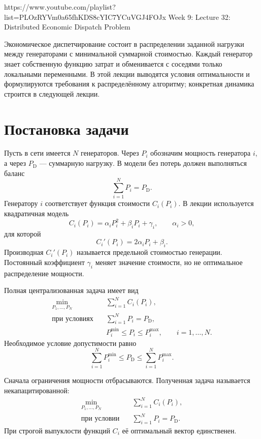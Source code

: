 
\sourcevideo
    {https://www.youtube.com/playlist?list=PLOzRYVm0a65fhKDS8cYIC7YCuVGJ4FOJx}
    {Week 9: Lecture 32: Distributed Economic Dispatch Problem}

Экономическое диспетчирование состоит в распределении заданной
нагрузки между генераторами с минимальной суммарной стоимостью. Каждый
генератор знает собственную функцию затрат и обменивается с соседями
только локальными переменными. В этой лекции выводятся условия
оптимальности и формулируются требования к распределённому алгоритму;
конкретная динамика строится в следующей лекции.

\section{Постановка задачи}

Пусть в сети имеется \(N\) генераторов. Через \(P_i\) обозначим
мощность генератора \(i\), а через \(P_{\mathrm D}\) --- суммарную
нагрузку. В модели без потерь должен выполняться баланс
\[
    \sum_{i=1}^{N}P_i=P_{\mathrm D}.
\]
Генератору \(i\) соответствует функция стоимости \(C_i(P_i)\). В
лекции используется квадратичная модель
\[
    C_i(P_i)
    =
    \alpha_iP_i^2+\beta_iP_i+\gamma_i,
    \qquad
    \alpha_i>0,
\]
для которой
\[
    C_i'(P_i)=2\alpha_iP_i+\beta_i.
\]
Производная \(C_i'(P_i)\) называется предельной стоимостью генерации.
Постоянный коэффициент \(\gamma_i\) меняет значение стоимости, но не
оптимальное распределение мощности.

Полная централизованная задача имеет вид
\[
\begin{aligned}
    \min_{P_1,\ldots,P_N}\quad
    &\sum_{i=1}^{N}C_i(P_i),
    \\
    \text{при условиях}\quad
    &\sum_{i=1}^{N}P_i=P_{\mathrm D},
    \\
    &P_i^{\min}\le P_i\le P_i^{\max},
    \qquad i=1,\ldots,N.
\end{aligned}
\]
Необходимое условие допустимости равно
\[
    \sum_{i=1}^{N}P_i^{\min}
    \le
    P_{\mathrm D}
    \le
    \sum_{i=1}^{N}P_i^{\max}.
\]

Сначала ограничения мощности отбрасываются. Полученная задача
называется некапацитированной:
\[
\begin{aligned}
    \min_{P_1,\ldots,P_N}\quad
    &\sum_{i=1}^{N}C_i(P_i),
    \\
    \text{при условии}\quad
    &\sum_{i=1}^{N}P_i=P_{\mathrm D}.
\end{aligned}
\]
При строгой выпуклости функций \(C_i\) её оптимальный вектор
единственен.

